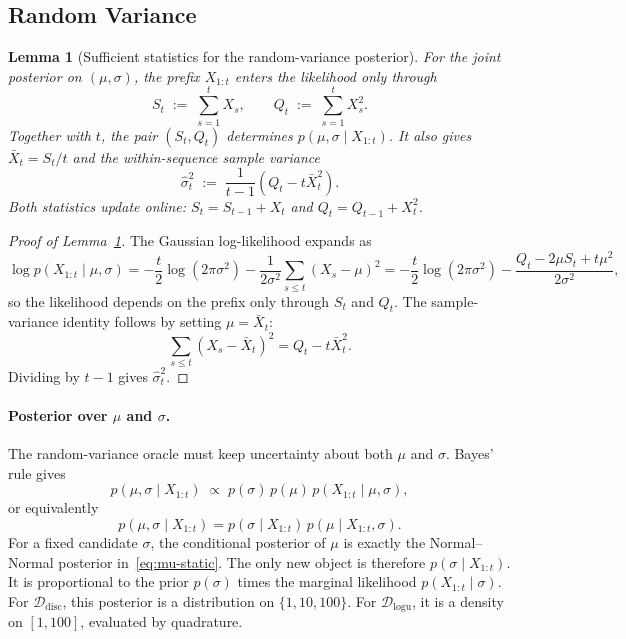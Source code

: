 \documentclass[11pt]{article}
\newtheorem{lemma}{Lemma}
\begin{document}
\subsection{Random Variance}
\label{app:adp-random}

\begin{lemma}[Sufficient statistics for the random-variance posterior]
\label{lem:random-sufficient-statistics}
For the joint posterior on \((\mu,\sigma)\), the prefix \(X_{1:t}\) enters the likelihood only through
\begin{equation}
\label{eq:S-Q-defs}
S_t \;:=\; \sum_{s=1}^t X_s,
\qquad
Q_t \;:=\; \sum_{s=1}^t X_s^2.
\end{equation}
Together with \(t\), the pair \((S_t,Q_t)\) determines \(p(\mu,\sigma\mid X_{1:t})\). It also gives
\(\bar X_t=S_t/t\) and the within-sequence sample variance
\[
\hat\sigma_t^2 \;:=\; \frac{1}{t-1}(Q_t - t\bar X_t^2).
\]
Both statistics update online: \(S_t=S_{t-1}+X_t\) and \(Q_t=Q_{t-1}+X_t^2\).
\end{lemma}

\begin{proof}[Proof of Lemma~\ref{lem:random-sufficient-statistics}]
The Gaussian log-likelihood expands as
\[
\log p(X_{1:t} \mid \mu, \sigma)
=
-\frac{t}{2}\log(2\pi\sigma^2)
-\frac{1}{2\sigma^2}\sum_{s\le t}(X_s-\mu)^2
=
-\frac{t}{2}\log(2\pi\sigma^2)
-\frac{Q_t-2\mu S_t+t\mu^2}{2\sigma^2},
\]
so the likelihood depends on the prefix only through \(S_t\) and \(Q_t\). The sample-variance identity follows by setting \(\mu=\bar X_t\):
\[
\sum_{s\le t}(X_s-\bar X_t)^2
=
Q_t-t\bar X_t^2 .
\]
Dividing by \(t-1\) gives \(\hat\sigma_t^2\).
\end{proof}

\paragraph{Posterior over \(\mu\) and \(\sigma\).}
The random-variance oracle must keep uncertainty about both \(\mu\) and \(\sigma\). Bayes' rule gives
\[
p(\mu, \sigma \mid X_{1:t}) \;\propto\; p(\sigma)\, p(\mu)\, p(X_{1:t} \mid \mu, \sigma),
\]
or equivalently
\[
p(\mu,\sigma\mid X_{1:t})
=
p(\sigma\mid X_{1:t})\,p(\mu\mid X_{1:t},\sigma).
\]
For a fixed candidate \(\sigma\), the conditional posterior of \(\mu\) is exactly the Normal--Normal posterior in~\eqref{eq:mu-static}. The only new object is therefore \(p(\sigma\mid X_{1:t})\). It is proportional to the prior \(p(\sigma)\) times the marginal likelihood \(p(X_{1:t}\mid\sigma)\). For \(\mathcal{D}_{\mathrm{disc}}\), this posterior is a distribution on \(\{1,10,100\}\). For \(\mathcal{D}_{\mathrm{logu}}\), it is a density on \([1,100]\), evaluated by quadrature.
\end{document}
